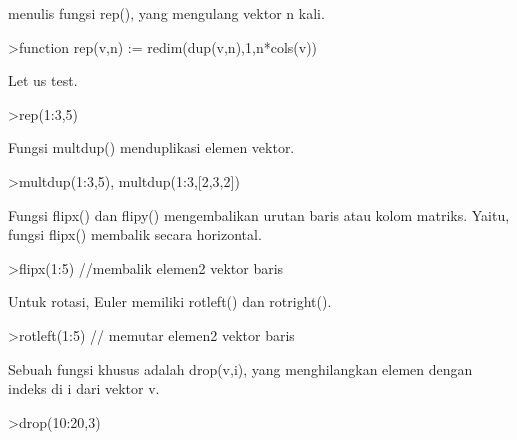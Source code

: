 \documentclass[a4paper,10pt]{article}
\begin{document}
\begin{eulernotebook}
\begin{eulercomment}
\begin{eulercomment}
\begin{eulercomment}
\begin{eulercomment}
\begin{eulercomment}
menulis fungsi rep(), yang mengulang vektor n kali.
\end{eulercomment}
\begin{eulerprompt}
>function rep(v,n) := redim(dup(v,n),1,n*cols(v))
\end{eulerprompt}
\begin{eulercomment}
Let us test.
\end{eulercomment}
\begin{eulerprompt}
>rep(1:3,5)
\end{eulerprompt}
\begin{euleroutput}
  [1,  2,  3,  1,  2,  3,  1,  2,  3,  1,  2,  3,  1,  2,  3]
\end{euleroutput}
\begin{eulercomment}
Fungsi multdup() menduplikasi elemen vektor.
\end{eulercomment}
\begin{eulerprompt}
>multdup(1:3,5), multdup(1:3,[2,3,2])
\end{eulerprompt}
\begin{euleroutput}
  [1,  1,  1,  1,  1,  2,  2,  2,  2,  2,  3,  3,  3,  3,  3]
  [1,  1,  2,  2,  2,  3,  3]
\end{euleroutput}
\begin{eulercomment}
Fungsi flipx() dan flipy() mengembalikan urutan baris atau kolom
matriks. Yaitu, fungsi flipx() membalik secara horizontal.
\end{eulercomment}
\begin{eulerprompt}
>flipx(1:5) //membalik elemen2 vektor baris
\end{eulerprompt}
\begin{euleroutput}
  [5,  4,  3,  2,  1]
\end{euleroutput}
\begin{eulercomment}
Untuk rotasi, Euler memiliki rotleft() dan rotright().
\end{eulercomment}
\begin{eulerprompt}
>rotleft(1:5) // memutar elemen2 vektor baris
\end{eulerprompt}
\begin{euleroutput}
  [2,  3,  4,  5,  1]
\end{euleroutput}
\begin{eulercomment}
Sebuah fungsi khusus adalah drop(v,i), yang menghilangkan elemen
dengan indeks di i dari vektor v.
\end{eulercomment}
\begin{eulerprompt}
>drop(10:20,3)
\end{eulerprompt}

\end{eulercomment}
\end{eulercomment}
\end{eulercomment}
\end{eulercomment}
\end{eulernotebook}
\end{document}
